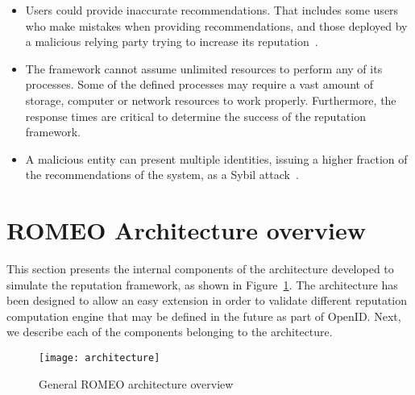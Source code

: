 \documentclass{llncs}
\begin{document}
\begin{itemize}
\item Users could provide inaccurate recommendations. That includes some users who make mistakes when providing recommendations, and those deployed by a malicious relying party trying to increase its reputation~\cite{trt:2011:Borg:ccis}. 

\item The framework cannot assume unlimited resources to perform any of its processes. Some of the defined processes may require a vast amount of storage, computer or network resources to work properly. Furthermore, the response times are critical to determine the success of the reputation framework.

\item A malicious entity can present multiple identities, issuing a higher fraction of the recommendations of the system, as a Sybil attack~\cite{idm:2002:douceur:iptps}.




\end{itemize}

\section{ROMEO Architecture overview}\label{sec:architecture}

This section presents the internal components of the architecture developed to simulate the reputation framework, as shown in Figure~\ref{fig:architecture}. The architecture has been designed to allow an easy extension in order to validate different reputation computation engine that may be defined in the future as part of OpenID. Next, we describe each of the components belonging to the architecture.

 \begin{figure}[!h]
   \centering
   \texttt{[image: architecture]}
   \caption{General ROMEO architecture overview}
   \label{fig:architecture}
 \end{figure}
\end{document}
